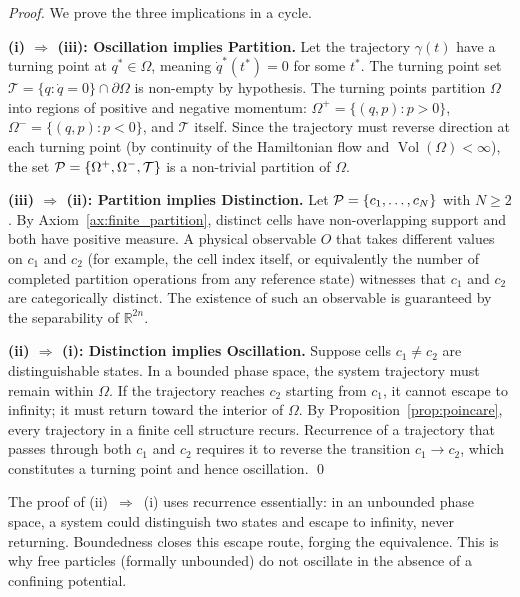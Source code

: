 \begin{proof}
We prove the three implications in a cycle.

\medskip
\noindent\textbf{(i) $\Rightarrow$ (iii): Oscillation implies Partition.}
Let the trajectory $\gamma(t)$ have a turning point at $q^* \in \Omega$,
meaning $\dot{q}^*(t^*) = 0$ for some $t^*$. The turning point set
$\mathcal{T} = \{q : \dot{q} = 0\} \cap \partial\Omega$ is non-empty by
hypothesis. The turning points partition $\Omega$ into regions of positive
and negative momentum: $\Omega^+ = \{(q,p) : p > 0\}$,
$\Omega^- = \{(q,p) : p < 0\}$, and $\mathcal{T}$ itself. Since the trajectory
must reverse direction at each turning point (by continuity of the Hamiltonian
flow and $\operatorname{Vol}(\Omega) < \infty$), the set
$\mathcal{P} = \{\Omega^+, \Omega^-, \mathcal{T}\}$ is a non-trivial partition of $\Omega$.

\medskip
\noindent\textbf{(iii) $\Rightarrow$ (ii): Partition implies Distinction.}
Let $\mathcal{P} = \{c_1, \ldots, c_N\}$ with $N \geq 2$. By Axiom~\ref{ax:finite_partition},
distinct cells have non-overlapping support and both have positive measure. A
physical observable $O$ that takes different values on $c_1$ and $c_2$ (for
example, the cell index itself, or equivalently the number of completed
partition operations from any reference state) witnesses that $c_1$ and $c_2$
are categorically distinct. The existence of such an observable is guaranteed
by the separability of $\mathbb{R}^{2n}$.

\medskip
\noindent\textbf{(ii) $\Rightarrow$ (i): Distinction implies Oscillation.}
Suppose cells $c_1 \neq c_2$ are distinguishable states. In a bounded phase
space, the system trajectory must remain within $\Omega$. If the trajectory
reaches $c_2$ starting from $c_1$, it cannot escape to infinity; it must
return toward the interior of $\Omega$. By Proposition~\ref{prop:poincare},
every trajectory in a finite cell structure recurs. Recurrence of a
trajectory that passes through both $c_1$ and $c_2$ requires it to reverse
the transition $c_1 \to c_2$, which constitutes a turning point and hence
oscillation. \qed
\end{proof}

\begin{remark}
The proof of (ii)~$\Rightarrow$~(i) uses recurrence essentially: in an unbounded
phase space, a system could distinguish two states and escape to infinity,
never returning. Boundedness closes this escape route, forging the equivalence.
This is why free particles (formally unbounded) do not oscillate in the absence
of a confining potential.
\end{remark}

